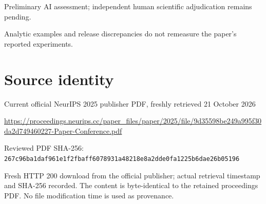 \documentclass[11pt]{article}
\begin{document}
Preliminary AI assessment; independent human scientific adjudication remains pending.\par

Analytic examples and release discrepancies do not remeasure the paper’s reported experiments.\par

\section*{Source identity}

Current official NeurIPS 2025 publisher PDF, freshly retrieved 21 October 2026

\url{https://proceedings.neurips.cc/paper_files/paper/2025/file/9d35598be249a995f30da2d749460227-Paper-Conference.pdf}

Reviewed PDF SHA-256: \nolinkurl{267c96ba1daf961e1f2fbaff6078931a48218e8a2dde0fa1225b6dae26b05196}

Fresh HTTP 200 download from the official publisher; actual retrieval timestamp and SHA-256 recorded. The content is byte-identical to the retained proceedings PDF. No file modification time is used as provenance.
\end{document}

